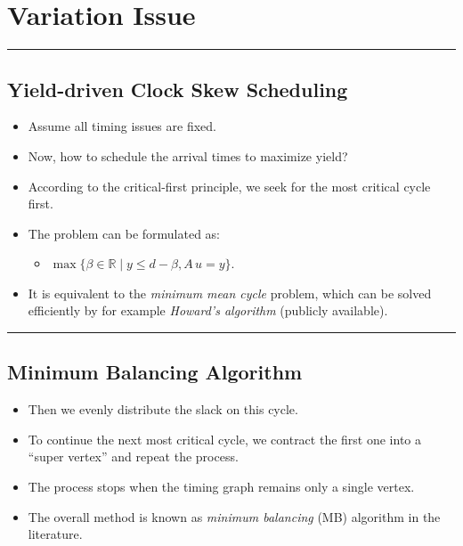 \documentclass[
]{article}
\providecommand{\tightlist}{%
  \setlength{\itemsep}{0pt}\setlength{\parskip}{0pt}}
\begin{document}
\section{Variation Issue}\label{variation-issue}

\begin{center}\rule{0.5\linewidth}{0.5pt}\end{center}

\subsection{Yield-driven Clock Skew Scheduling}\label{yield-driven-clock-skew-scheduling}

\begin{itemize}
\tightlist
\item
  Assume all timing issues are fixed.
\item
  Now, how to schedule the arrival times to maximize yield?
\item
  According to the critical-first principle, we seek for the most
  critical cycle first.
\item
  The problem can be formulated as:

  \begin{itemize}
  \tightlist
  \item
    \(\max\{\beta \in \mathbb{R} \mid y \leq d - \beta, A\,u = y\}\).
  \end{itemize}
\item
  It is equivalent to the \emph{minimum mean cycle} problem, which can be
  solved efficiently by for example \emph{Howard's algorithm} (publicly
  available).
\end{itemize}

\begin{center}\rule{0.5\linewidth}{0.5pt}\end{center}

\subsection{Minimum Balancing Algorithm}\label{minimum-balancing-algorithm}

\begin{itemize}
\tightlist
\item
  Then we evenly distribute the slack on this cycle.
\item
  To continue the next most critical cycle, we contract the first one
  into a ``super vertex'' and repeat the process.
\item
  The process stops when the timing graph remains only a single
  vertex.
\item
  The overall method is known as \emph{minimum balancing} (MB) algorithm in
  the literature.
\end{itemize}
\end{document}
